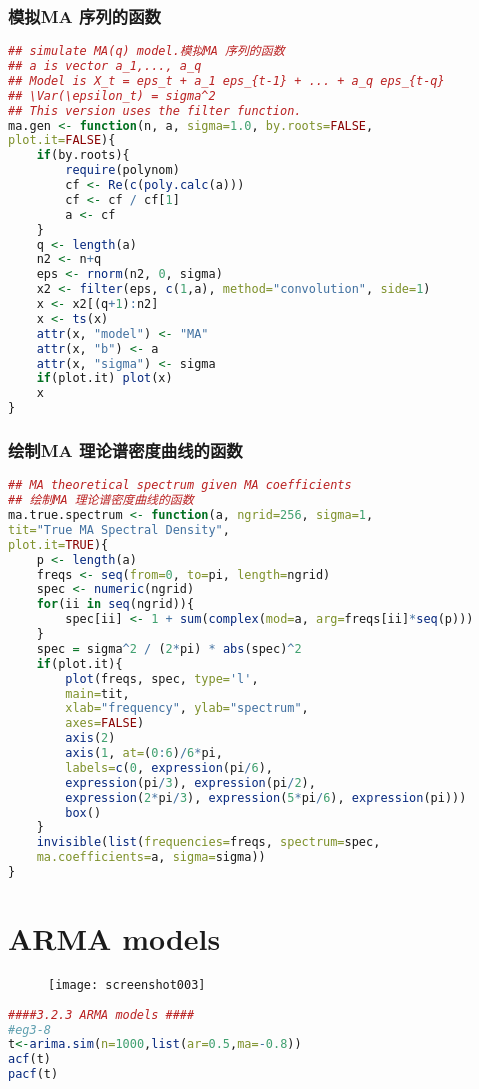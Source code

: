 \documentclass[11pt,a4paper,oneside]{book}
\begin{document}
\subsection{模拟MA 序列的函数}
\begin{lstlisting}[language=r]
## simulate MA(q) model.模拟MA 序列的函数
## a is vector a_1,..., a_q
## Model is X_t = eps_t + a_1 eps_{t-1} + ... + a_q eps_{t-q}
## \Var(\epsilon_t) = sigma^2
## This version uses the filter function.
ma.gen <- function(n, a, sigma=1.0, by.roots=FALSE,
plot.it=FALSE){
	if(by.roots){
		require(polynom)
		cf <- Re(c(poly.calc(a)))
		cf <- cf / cf[1]
		a <- cf
	}
	q <- length(a)
	n2 <- n+q
	eps <- rnorm(n2, 0, sigma)
	x2 <- filter(eps, c(1,a), method="convolution", side=1)
	x <- x2[(q+1):n2]
	x <- ts(x)
	attr(x, "model") <- "MA"
	attr(x, "b") <- a
	attr(x, "sigma") <- sigma
	if(plot.it) plot(x)
	x
}
\end{lstlisting}
\subsection{绘制MA 理论谱密度曲线的函数}
\begin{lstlisting}[language=r]
## MA theoretical spectrum given MA coefficients
## 绘制MA 理论谱密度曲线的函数
ma.true.spectrum <- function(a, ngrid=256, sigma=1,
tit="True MA Spectral Density",
plot.it=TRUE){
	p <- length(a)
	freqs <- seq(from=0, to=pi, length=ngrid)
	spec <- numeric(ngrid)
	for(ii in seq(ngrid)){
		spec[ii] <- 1 + sum(complex(mod=a, arg=freqs[ii]*seq(p)))
	}
	spec = sigma^2 / (2*pi) * abs(spec)^2
	if(plot.it){
		plot(freqs, spec, type='l',
		main=tit,
		xlab="frequency", ylab="spectrum",
		axes=FALSE)
		axis(2)
		axis(1, at=(0:6)/6*pi,
		labels=c(0, expression(pi/6),
		expression(pi/3), expression(pi/2),
		expression(2*pi/3), expression(5*pi/6), expression(pi)))
		box()
	}
	invisible(list(frequencies=freqs, spectrum=spec,
	ma.coefficients=a, sigma=sigma))
}
\end{lstlisting}
\chapter{ARMA models}
\begin{figure}[H]
	\centering
	\texttt{[image: screenshot003]}
	\caption{}
	\label{fig:screenshot003}
\end{figure}

\begin{lstlisting}[language=r]
####3.2.3 ARMA models ####
#eg3-8
t<-arima.sim(n=1000,list(ar=0.5,ma=-0.8))
acf(t)
pacf(t)
\end{lstlisting}
\end{document}
